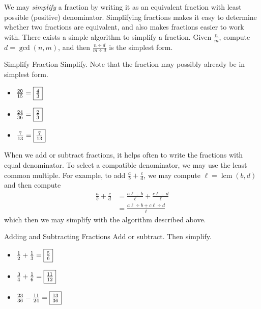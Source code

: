 \documentclass[a4paper,10pt]{report}
\begin{document}
We may \emph{simplify} a fraction by writing it as an equivalent fraction with
least possible (positive) denominator. Simplifying fractions makes it easy to
determine whether two fractions are equivalent, and also makes fractions easier
to work with. There exists a simple algorithm to simplify a fraction. Given
$\frac{n}{m}$, compute $d=\gcd(n, m)$, and then $\frac{n\div d}{m\div d}$ is the
simplest form.

\begin{problem}{Simplify Fraction}
 Simplify. Note that the fraction may possibly already be in simplest form.

 \begin{itemize}
  \item $\frac{20}{15}=\Ans{\frac{4}{3}}$
  \item $\frac{24}{36}=\Ans{\frac{2}{3}}$
  \item $\frac{7}{13}=\Ans{\frac{7}{13}}$
 \end{itemize}
\end{problem}

When we add or subtract fractions, it helps often to write the fractions with
equal denominator. To select a compatible denominator, we may use the least
common multiple. For example, to add $\frac{a}{b}+\frac{c}{d}$, we may compute
$\ell=\operatorname{lcm}(b, d)$ and then compute \begin{align*}
 \frac{a}{b}+\frac{c}{d}
 &= \frac{a\ell\div b}{\ell} + \frac{c\ell\div d}{\ell} \\
 &= \frac{a\ell\div b + c\ell\div d}{\ell}
\end{align*} which then we may simplify with the algorithm described above.

\begin{problem}{Adding and Subtracting Fractions}
 Add or subtract. Then simplify.

 \begin{itemize}
  \item $\frac{1}{2} + \frac{1}{3} = \Ans{\frac{5}{6}}$
  \item $\frac{3}{4} + \frac{1}{6} = \Ans{\frac{11}{12}}$
  \item $\frac{23}{36} - \frac{11}{24} = \Ans{\frac{13}{36}}$
 \end{itemize}
\end{problem}
\end{document}
